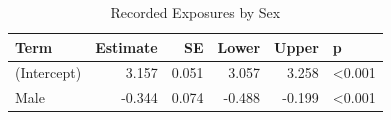\begin{table}

\caption{\label{tab:sex_breaches}Recorded Exposures by Sex}
\centering
\begin{tabular}[t]{lrrrrl}
\toprule
Term & Estimate & SE & Lower & Upper & p\\
\midrule
(Intercept) & 3.157 & 0.051 & 3.057 & 3.258 & <0.001\\
Male & -0.344 & 0.074 & -0.488 & -0.199 & <0.001\\
\bottomrule
\end{tabular}
\end{table}
